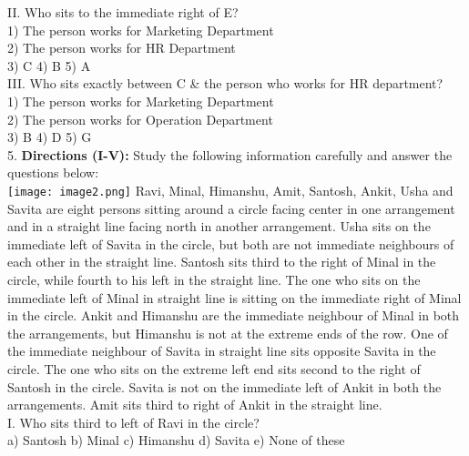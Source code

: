 \documentclass[
]{article}
\begin{document}
II. Who sits to the immediate right of E?\\
1) The person works for Marketing Department\\
2) The person works for HR Department\\
3) C \hspace{2mm}4) B \hspace{2mm}5) A\\

III. Who sits exactly between C \& the person who works for HR department?\\
1) The person works for Marketing Department\\
2) The person works for Operation Department\\
3) B \hspace{2mm}4) D \hspace{2mm}5) G\\

5. \textbf{Directions (I-V):} Study the following information carefully and answer the questions below:\\
\texttt{[image: image2.png]}
Ravi, Minal, Himanshu, Amit, Santosh, Ankit, Usha and Savita are eight persons sitting
around a circle facing center in one arrangement and in a straight line facing north in
another arrangement. Usha sits on the immediate left of Savita in the circle, but both are not
immediate neighbours of each other in the straight line. Santosh sits third to the right of
Minal in the circle, while fourth to his left in the straight line. The one who sits on the
immediate left of Minal in straight line is sitting on the immediate right of Minal in the
circle. Ankit and Himanshu are the immediate neighbour of Minal in both the
arrangements, but Himanshu is not at the extreme ends of the row. One of the immediate
neighbour of Savita in straight line sits opposite Savita in the circle. The one who sits on the
extreme left end sits second to the right of Santosh in the circle. Savita is not on the
immediate left of Ankit in both the arrangements. Amit sits third to right of Ankit in the
straight line.\\

I. Who sits third to left of Ravi in the circle?\\
a) Santosh \hspace{2mm}b) Minal \hspace{2mm}c) Himanshu \hspace{2mm}d) Savita \hspace{2mm}e) None of these\\
\end{document}
